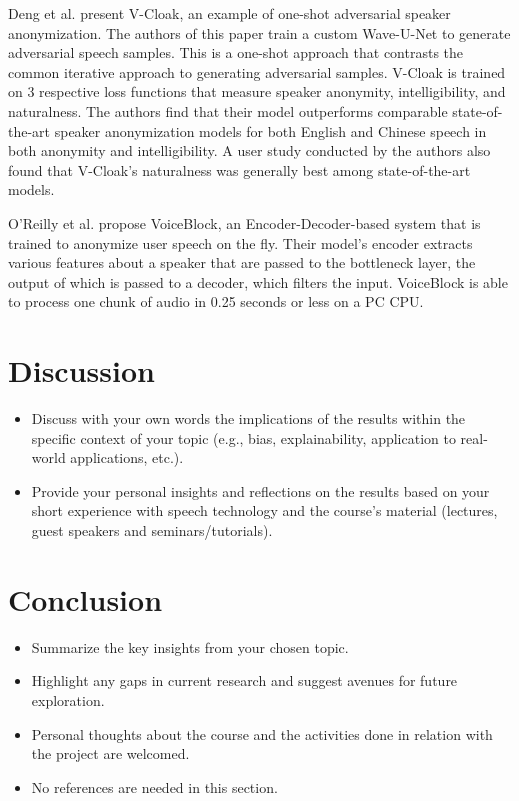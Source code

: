 \documentclass{Interspeech2024}
\begin{document}
Deng et al. \cite{deng_2023_v_cloak} present V-Cloak, an example of one-shot adversarial speaker anonymization. 
The authors of this paper train a custom Wave-U-Net to generate adversarial speech samples. 
This is a one-shot approach that contrasts the common iterative approach to generating adversarial samples. 
V-Cloak is trained on 3 respective loss functions that measure speaker anonymity, intelligibility, and naturalness. 
The authors find that their model outperforms comparable state-of-the-art speaker anonymization models for both English and Chinese speech in both anonymity and intelligibility. 
A user study conducted by the authors also found that V-Cloak's naturalness was generally best among state-of-the-art models.

O'Reilly et al. \cite{oreilly_2022_voiceblock} propose VoiceBlock, an Encoder-Decoder-based system that is trained to anonymize user speech on the fly. 
Their model's encoder extracts various features about a speaker that are passed to the bottleneck layer, the output of which is passed to a decoder, which filters the input. 
VoiceBlock is able to process one chunk of audio in 0.25 seconds or less on a PC CPU.


\section{Discussion}
\begin{itemize}
    \item Discuss with your own words the implications of the results within the specific context of your topic (e.g., bias, explainability, application to real-world applications, etc.).
    \item Provide your personal insights and reflections on the results based on your short experience with speech technology and the course’s material (lectures, guest speakers and seminars/tutorials).
\end{itemize}




\section{Conclusion}

\begin{itemize}
    \item Summarize the key insights from your chosen topic.
    \item Highlight any gaps in current research and suggest avenues for future exploration.
    \item Personal thoughts about the course and the activities done in relation with the project are welcomed.
    \item No references are needed in this section.
\end{itemize}






\end{document}
